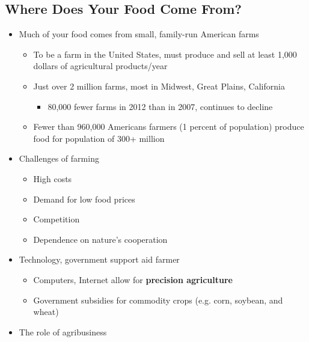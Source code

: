 \documentclass[12pt]{article}
\begin{document}
        \subsection{Where Does Your Food Come From?}
            \begin{itemize}
                \item Much of your food comes from small, family-run American farms
                    \begin{itemize}
                        \item To be a farm in the United States, must produce and sell at least 1,000 dollars of agricultural products/year
                        \item Just over 2 million farms, most in Midwest, Great Plains, California
                            \begin{itemize}
                                \item 80,000 fewer farms in 2012 than in 2007, continues to decline
                            \end{itemize}
                        \item Fewer than 960,000 Americans farmers (1 percent of population) produce food for population of 300+ million
                    \end{itemize}
                \item Challenges of farming
                    \begin{itemize}
                        \item High costs
                        \item Demand for low food prices
                        \item Competition
                        \item Dependence on nature's cooperation
                    \end{itemize}
                \item Technology, government support aid farmer
                    \begin{itemize}
                        \item Computers, Internet allow for \textbf{precision agriculture}
                        \item Government subsidies for commodity crops (e.g. corn, soybean, and wheat)
                    \end{itemize}
                \item The role of agribusiness
                    \begin{itemize}

\end{itemize}
\end{itemize}
\end{document}
